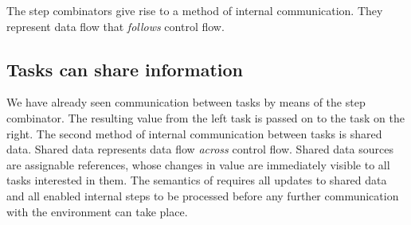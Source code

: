 The step combinators give rise to a method of internal communication.
They represent data flow that \emph{follows} control flow.




\subsection{Tasks can share information}

We have already seen communication between tasks by means of the step
combinator. The resulting value from the left task is passed on to the task on
the right. The second method of internal communication between tasks is shared
data.
Shared data represents data flow \emph{across} control flow.
Shared data sources are assignable references, whose changes in value are immediately visible to all tasks interested in them.
The semantics of \TOPHAT requires all updates to shared data and all enabled internal steps to be processed before any further communication with the environment can take place.



